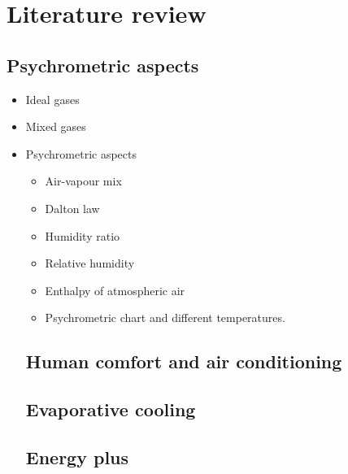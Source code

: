 \chapter{Literature review}
\label{chap:review}



\section{Psychrometric aspects}
\begin{itemize}
	\item Ideal gases
	\item Mixed gases
	\item Psychrometric aspects
			\begin{itemize}
				\item Air-vapour mix
				\item Dalton law
				\item Humidity ratio
				\item Relative humidity
				\item Enthalpy of atmospheric air
				\item Psychrometric chart and 							different temperatures.
			\end{itemize}
		
\section{Human comfort and air conditioning}

\section{Evaporative cooling}

\section{Energy plus}
\end{itemize}